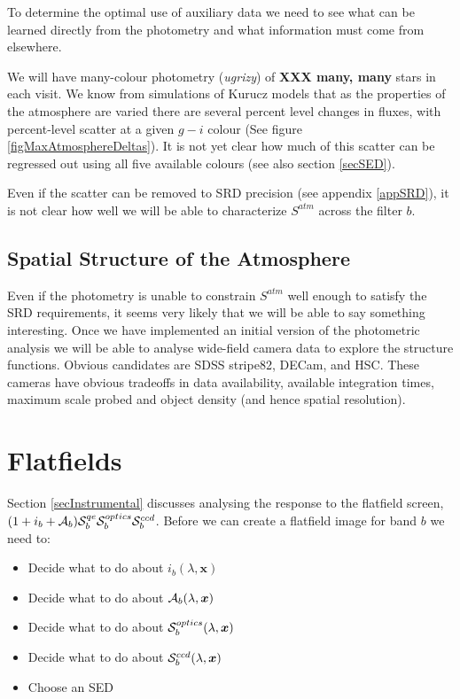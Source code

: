 \documentclass[12pt]{article}
\newcommand{\xb}{{\boldsymbol x}}
\newcommand{\additive}{{\cal A}}
\newcommand{\qe}{{\cal S}}
\newcommand{\XXX}[1]{\textbf{XXX #1}\xspace}
\begin{document}
To determine the optimal use of auxiliary data we need to see what can be learned directly from the
photometry and what information must come from elsewhere.

We will have many-colour photometry (\textit{ugrizy}) of \XXX{many, many} stars in each visit.  We know from
simulations of Kurucz models that as the properties of the atmosphere are varied there are several percent
level changes in fluxes, with percent-level scatter at a given $g - i$ colour (See figure
\ref{figMaxAtmosphereDeltas}).  It is not yet clear how much of this scatter can be regressed out using all
five available colours (see also section \ref{secSED}).

Even if the scatter can be removed to SRD precision (see appendix \ref{appSRD}), it is not clear how well
we will be able to characterize $S^{atm}$ across the filter $b$.

\subsection{Spatial Structure of the Atmosphere}

Even if the photometry is unable to constrain $S^{atm}$ well enough to satisfy the SRD requirements, it seems
very likely that we will be able to say something interesting.  Once we have implemented an initial version of
the photometric analysis we will be able to analyse wide-field camera data to explore the structure functions.
Obvious candidates are SDSS stripe82, DECam, and HSC.  These cameras have obvious tradeoffs in data
availability, available integration times, maximum scale probed and object density (and hence spatial
resolution).

\section{Flatfields}
\label{secFlatFielding}

Section \ref{secInstrumental} discusses analysing the response to the flatfield screen,
$(1 + i_b + \additive_b) \qe_b^{qe} \qe_b^{optics} \qe_b^{ccd}$.
Before we can create a flatfield image for band $b$ we need to:
\begin{itemize}
\item Decide what to do about $i_b(\lambda, \xb)$
\item Decide what to do about $\additive_b(\lambda, \xb)$
\item Decide what to do about $\qe_b^{optics}(\lambda, \xb)$
\item Decide what to do about $\qe_b^{ccd}(\lambda, \xb)$
\item Choose an SED
\end{itemize}
\end{document}
